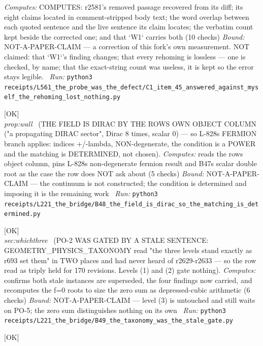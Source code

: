 \begin{description}
\emph{Computes:} COMPUTES: r2581's removed passage recovered from its diff; its eight claims located in comment-stripped body text; the word overlap between each quoted sentence and the live sentence its claim locates; the verbatim count kept beside the corrected one; and that `W1` carries both (10 checks)
 \emph{Bound:} NOT-A-PAPER-CLAIM --- a correction of this fork's own measurement. NOT claimed: that `W1`'s finding changes; that every rehoming is lossless --- one is checked, by name; that the exact-string count was useless, it is kept so the error stays legible.
\ \emph{Run:} \texttt{python3 receipts/L561\_the\_probe\_was\_the\_defect/C1\_item\_45\_answered\_against\_myself\_the\_rehoming\_lost\_nothing.py}
\item[\label{rcpt:B48_the_field_is_dirac_so_the_matching_is_determined}\texttt{B48\_the\_field\_is\_dirac\_so\_the\_matching\_is\_determined}]\hfill\textsf{[OK]}\\
\textit{prop:wall} \ (THE FIELD IS DIRAC BY THE ROWS OWN OBJECT COLUMN ("a propagating DIRAC sector", Dirac 8 times, scalar 0) --- so L-828s FERMION branch applies: indices +/-lambda, NON-degenerate, the condition is a POWER and the matching is DETERMINED, not chosen). 
\emph{Computes:} reads the rows object column, pins L-828s non-degenerate fermion result and B47s scalar double root as the case the row does NOT ask about (5 checks)
 \emph{Bound:} NOT-A-PAPER-CLAIM --- the continuum is not constructed; the condition is determined and imposing it is the remaining work
\ \emph{Run:} \texttt{python3 receipts/L221\_the\_bridge/B48\_the\_field\_is\_dirac\_so\_the\_matching\_is\_determined.py}
\item[\label{rcpt:B49_the_taxonomy_was_the_stale_gate}\texttt{B49\_the\_taxonomy\_was\_the\_stale\_gate}]\hfill\textsf{[OK]}\\
\textit{sec:whichthree} \ (PO-2 WAS GATED BY A STALE SENTENCE: GEOMETRY\_PHYSICS\_TAXONOMY read "the three levels stand exactly as r693 set them" in TWO places and had never heard of r2629-r2633 --- so the row read as triply held for 170 revisions. Levels (1) and (2) gate nothing). 
\emph{Computes:} confirms both stale instances are superseded, the four findings now carried, and recomputes the f=0 roots to size the zero sum as depressed-cubic arithmetic (6 checks)
 \emph{Bound:} NOT-A-PAPER-CLAIM --- level (3) is untouched and still waits on PO-5; the zero sum distinguishes nothing on its own
\ \emph{Run:} \texttt{python3 receipts/L221\_the\_bridge/B49\_the\_taxonomy\_was\_the\_stale\_gate.py}
\item[\label{rcpt:B50_a_forced_number_on_the_wrong_wall}\texttt{B50\_a\_forced\_number\_on\_the\_wrong\_wall}]\hfill\textsf{[OK]}\\

\end{description}
